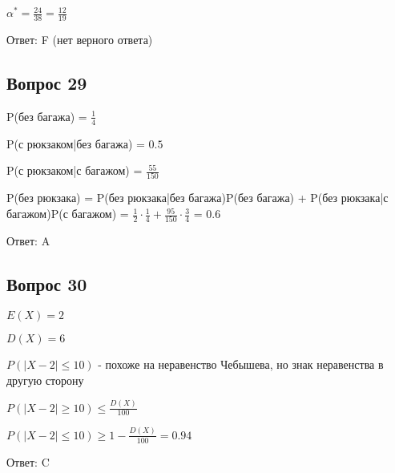 \documentclass{article}
\begin{document}
\begin{flushleft}
$\alpha^{*} = \frac{24}{38} =\frac{12}{19}$

Ответ: F (нет верного ответа)

\subsection{Вопрос 29}

P(без багажа) = $\frac{1}{4}$

P(с рюкзаком|без багажа) = $0.5$

P(с рюкзаком|с багажом) = $\frac{55}{150}$

P(без рюкзака) = P(без рюкзака|без багажа)P(без багажа) + P(без рюкзака|с багажом)P(с багажом) = $\frac{1}{2}\cdot\frac{1}{4} + \frac{95}{150} \cdot\frac{3}{4}$ = 0.6

Ответ: A

\subsection{Вопрос 30}

$E(X) = 2$

$D(X) = 6$

$P(|X - 2| \leq10)$ - похоже на неравенство Чебышева, но знак неравенства в другую сторону

$P(|X-2| \geq 10) \leq \frac{D(X)}{100}$

$P(|X-2| \leq 10) \geq 1 - \frac{D(X)}{100} = 0.94$

Ответ: C

\end{flushleft}
\end{document}
